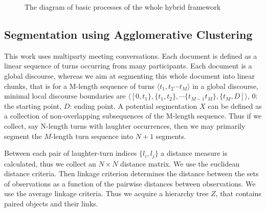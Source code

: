 \documentclass{article}
\newcommand{\background}[5]{%
  \begin{pgfonlayer}{background}
    \path (#1.west |- #2.north)+(-0.5,0.5) node (a1) {};
    \path (#3.east |- #4.south)+(+0.5,-0.25) node (a2) {};
    \path[fill=yellow!20,rounded corners, draw=black!50, dashed]
      (a1) rectangle (a2);
    \path (a1.east |- a1.south)+(0.9,-0.28) node (u1)[texto]
      {\scriptsize\textit{#5}};
  \end{pgfonlayer}}
\begin{document}
\begin{figure}
\caption{\footnotesize The diagram of basic processes of the whole hybrid framework}\label{fig:proc}
 \end{figure} 
 \vspace{-0.01em}

\subsection{Segmentation using Agglomerative Clustering}\label{sec:hclus}
This work uses multiparty meeting conversations. Each document is defined as a linear sequence of turns occurring from many participants. Each document is a global discourse, whereas we aim at segmenting this whole document into linear chunks, that is for a M-length sequence of turns $\langle t_1, t_2 \cdots t_M \rangle$  in a global discourse, minimal local discourse boundaries are $\langle [0,t_1\},\{t_1,t_2\}, \cdots \{t_{M-1}t_M\}, \{t_M, D]\rangle$, $0$: the starting point, $D$: ending point. A potential segmentation $X$ can be defined as a collection of non-overlapping subsequences of the M-length sequence. Thus if we collect, say N-length turns with laughter occurrences, then we may primarily segment the $M$-length turn sequence into $N+1$ segments.
%

Between each pair of laughter-turn indices $\{l_i, l_j\}$ a distance measure is calculated, thus we collect an $N\times N$ distance matrix. We use the euclidean distance criteria. Then linkage criterion determines the distance between the sets of observations as a function of the pairwise distances between observations. We use the average linkage criteria. Thus we acquire a hierarchy tree $Z$, that contains paired objects and their links. %
\end{document}
